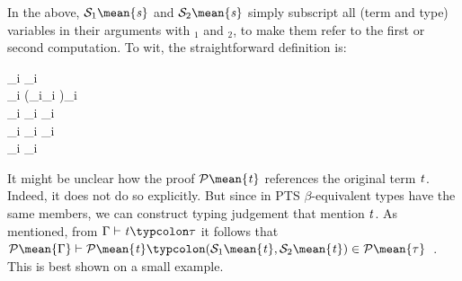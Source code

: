 In the above, \ensuremath{\mathcal{S}_1 \mean{\Varid{s}}} and \ensuremath{\mathcal{S}_2 \mean{\Varid{s}}} simply subscript all (term and type) variables in
their arguments with ${}_1$ and ${}_2$, to make them refer to the first or
second computation. To wit, the straightforward definition is:
\begin{hscode}\SaveRestoreHook
{}%
%
%
\>[3]{}_i \mathrel{=}_i{}\<[E]%
\\
\>[3]{}_i \mathrel{=}\lambda (_i\typcolon{}_i \mean{\sigma})\to {}_i \<[E]%
\\
\>[3]{}_i \mathrel{=}_i \;_i \<[E]%
\\
\>[3]{}_i \mean{\sigma\to \tau}\mathrel{=}_i \mean{\sigma}\to {}_i \mean{\tau}{}\<[E]%
\\
\>[3]{}_i \mean{\alpha}\mathrel{=}\alpha_i{}\<[E]%
\ColumnHook
\end{hscode}\resethooks

It might be unclear how the proof \ensuremath{\mathcal{P}\mean{\Varid{t}}} references the original term \ensuremath{\Varid{t}}.
Indeed, it does not do so explicitly. But since in PTS $\beta$-equivalent types
have the same members, we can construct typing judgement that mention \ensuremath{\Varid{t}}. As
mentioned, from \ensuremath{\Gamma\vdash\Varid{t}\typcolon\tau} it follows that
\ensuremath{\mathcal{P}\mean{\Gamma}\vdash\mathcal{P}\mean{\Varid{t}}\typcolon(\mathcal{S}_1 \mean{\Varid{t}},\mathcal{S}_2 \mean{\Varid{t}})\in \mathcal{P}\mean{\tau}}~\citep[Th.
3]{Bernardy2011realizability}. This is best shown on a small example.

